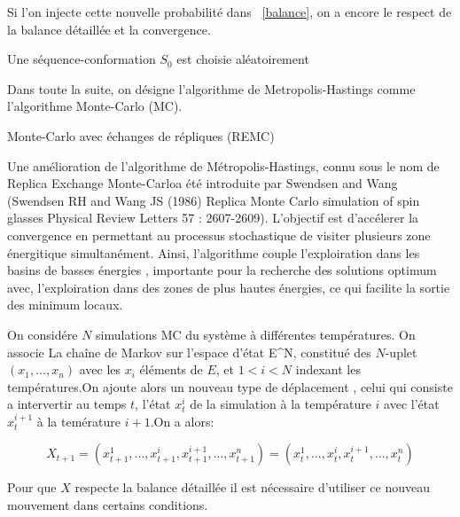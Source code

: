Si l'on injecte cette nouvelle probabilité dans ~\ref{balance}, on a encore le respect de la balance détaillée et la convergence.


\begin{algorithm}
  Une séquence-conformation $S_0$ est choisie aléatoirement\;
  
\end{algorithm}


Dans toute la suite, on désigne l'algorithme de Metropolis-Hastings comme l'algorithme Monte-Carlo (MC).  


Monte-Carlo avec échanges de répliques (REMC)


Une amélioration de l'algorithme de Métropolis-Hastings, connu sous le nom de \og Replica Exchange Monte-Carlo\fg a été introduite par Swendsen and Wang (Swendsen RH and Wang JS (1986) Replica Monte Carlo simulation of spin glasses Physical Review Letters 57 : 2607-2609). L'objectif est d'accélerer la convergence en permettant au processus stochastique de visiter plusieurs zone énergitique simultanément. Ainsi, l'algorithme couple l'exploiration dans les basins de basses énergies , importante pour la recherche des solutions optimum avec, l'exploiration dans des zones de plus hautes énergies, ce qui facilite la sortie des minimum locaux.

On considére $ N$ simulations MC du système à différentes températures. On associe La chaîne de Markov sur l'espace d'état E^N, constitué des $N$-uplet $(x_1,...,x_n)$ avec les $x_i$ éléments de $E$, et $1<i<N$  indexant les températures.On ajoute alors un nouveau type de déplacement , celui qui consiste a intervertir au temps $t$, l'état $x_t^i$ de la simulation à la température $i$ avec l'état $x_t^{i+1}$ à la temérature $i+1$.On a alors:

\begin{equation}
  \label{REMC_move}
X_{t+1}=(x_{t+1}^1,...,x_{t+1}^i,x_{t+1}^{i+1},...,x_{t+1}^n) = (x_t^1,...,x_t^i,x_t^{i+1},...,x_t^n)
\end{equation}


Pour que $X$ respecte la balance détaillée il est nécessaire d'utiliser ce nouveau mouvement dans certains conditions.

